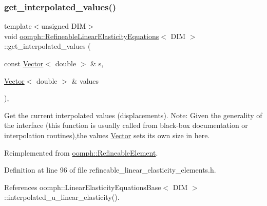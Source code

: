 \subsubsection{\texorpdfstring{get\+\_\+interpolated\+\_\+values()}{get\_interpolated\_values()}\hspace{0.1cm}{\footnotesize\ttfamily [2/2]}}
{\footnotesize\ttfamily template$<$unsigned D\+IM$>$ \\
void \hyperlink{classoomph_1_1RefineableLinearElasticityEquations}{oomph\+::\+Refineable\+Linear\+Elasticity\+Equations}$<$ D\+IM $>$\+::get\+\_\+interpolated\+\_\+values (\begin{DoxyParamCaption}\item[{const \hyperlink{classoomph_1_1Vector}{Vector}$<$ double $>$ \&}]{s,  }\item[{\hyperlink{classoomph_1_1Vector}{Vector}$<$ double $>$ \&}]{values }\end{DoxyParamCaption})\hspace{0.3cm}{\ttfamily [inline]}, {\ttfamily [virtual]}}



Get the current interpolated values (displacements). Note\+: Given the generality of the interface (this function is usually called from black-\/box documentation or interpolation routines),the values \hyperlink{classoomph_1_1Vector}{Vector} sets its own size in here. 



Reimplemented from \hyperlink{classoomph_1_1RefineableElement_ad9a4f92880668a2373326d8306365c43}{oomph\+::\+Refineable\+Element}.



Definition at line 96 of file refineable\+\_\+linear\+\_\+elasticity\+\_\+elements.\+h.



References oomph\+::\+Linear\+Elasticity\+Equations\+Base$<$ D\+I\+M $>$\+::interpolated\+\_\+u\+\_\+linear\+\_\+elasticity().

\mbox{\label{classoomph_1_1RefineableLinearElasticityEquations_aa3b8251eb0a6d153eb7de8b032c1ffcd}} 
